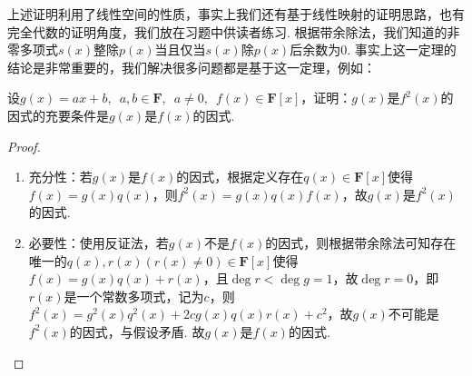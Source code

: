 上述证明利用了线性空间的性质，事实上我们还有基于线性映射的证明思路，也有完全代数的证明角度，我们放在习题中供读者练习. 根据带余除法，我们知道的非零多项式$s(x)$整除$p(x)$当且仅当$s(x)$除$p(x)$后余数为$0$. 事实上这一定理的结论是非常重要的，我们解决很多问题都是基于这一定理，例如：
\begin{example}{}{}
    设$g(x)=ax+b,\enspace a,b\in\mathbf{F},\enspace a\neq 0,\enspace
        f(x)\in \mathbf{F}[x]$，证明：$g(x)$是$f^2(x)$的因式的充要条件是$g(x)$是$f(x)$的因式.
\end{example}
\begin{proof}
    \begin{enumerate}
        \item  充分性：若$g(x)$是$f(x)$的因式，根据定义存在$q(x)\in\mathbf{F}[x]$使得$f(x)=g(x)q(x)$，则$f^2(x)=g(x)q(x)f(x)$，故$g(x)$是$f^2(x)$的因式.
        \item 必要性：使用反证法，若$g(x)$不是$f(x)$的因式，则根据带余除法可知存在唯一的$q(x),r(x)(r(x)\neq 0)\in\mathbf{F}[x]$使得$f(x)=g(x)q(x)+r(x)$，且$\deg r<\deg g=1$，故$\deg r=0$，即$r(x)$是一个常数多项式，记为$c$，则$f^2(x)=g^2(x)q^2(x)+2cg(x)q(x)r(x)+c^2$，故$g(x)$不可能是$f^2(x)$的因式，与假设矛盾. 故$g(x)$是$f(x)$的因式.
    \end{enumerate}
\end{proof}


